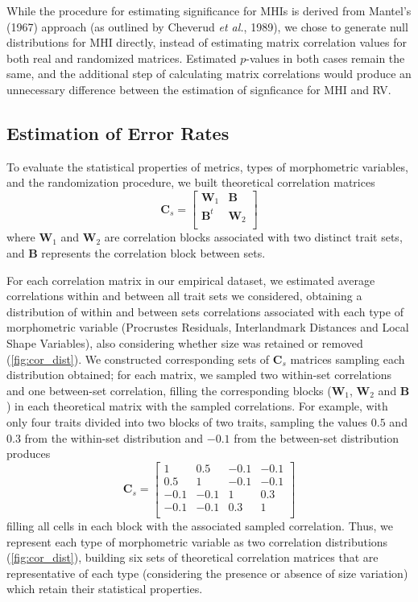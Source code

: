 \documentclass[12pt,twoside]{report}
\begin{document}
While the procedure for estimating significance for MHIs is derived from
Mantel's (1967) approach (as outlined by Cheverud \emph{et al.}, 1989),
we chose to generate null distributions for MHI directly, instead of
estimating matrix correlation values for both real and randomized
matrices. Estimated $p$-values in both cases remain the same, and the
additional step of calculating matrix correlations would produce an
unnecessary difference between the estimation of signficance for MHI and
RV.

\subsection{Estimation of Error Rates}\label{estimation-of-error-rates}

To evaluate the statistical properties of metrics, types of morphometric
variables, and the randomization procedure, we built theoretical
correlation matrices \[
\mathbf{C}_{s} =
\begin{bmatrix}
\mathbf{W}_1 & \mathbf{B} \\
\mathbf{B}^t & \mathbf{W}_2 \\
\end{bmatrix}
\] where $\mathbf{W}_1$ and $\mathbf{W}_2$ are correlation blocks
associated with two distinct trait sets, and $\mathbf{B}$ represents the
correlation block between sets.

For each correlation matrix in our empirical dataset, we estimated
average correlations within and between all trait sets we considered,
obtaining a distribution of within and between sets correlations
associated with each type of morphometric variable (Procrustes
Residuals, Interlandmark Distances and Local Shape Variables), also
considering whether size was retained or removed
(\autoref{fig:cor_dist}). We constructed corresponding sets of
$\mathbf{C}_{s}$ matrices sampling each distribution obtained; for each
matrix, we sampled two within-set correlations and one between-set
correlation, filling the corresponding blocks ($\mathbf{W}_1$,
$\mathbf{W}_2$ and $\mathbf{B}$) in each theoretical matrix with the
sampled correlations. For example, with only four traits divided into
two blocks of two traits, sampling the values $0.5$ and $0.3$ from the
within-set distribution and $-0.1$ from the between-set distribution
produces \[
\mathbf{C}_s =
\begin{bmatrix}
1 & 0.5 & -0.1 & -0.1 \\
0.5 & 1 & -0.1 & -0.1 \\
-0.1 & -0.1 & 1 & 0.3 \\
-0.1 & -0.1 & 0.3 & 1 \\
\end{bmatrix}
\] filling all cells in each block with the associated sampled
correlation. Thus, we represent each type of morphometric variable as
two correlation distributions (\autoref{fig:cor_dist}), building six
sets of theoretical correlation matrices that are representative of each
type (considering the presence or absence of size variation) which
retain their statistical properties.
\end{document}
